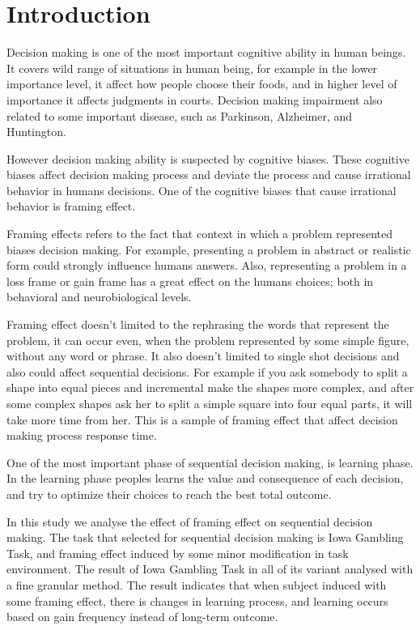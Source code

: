 \section{Introduction}

Decision making is one of the most important
cognitive ability in human beings.  It covers wild
range of situations in human being, for example in
the lower importance level, it affect how people
choose their foods, and in higher level of
importance it affects judgments in courts.
Decision making impairment also related to some
important disease, such as Parkinson, Alzheimer,
and Huntington.

However decision making ability is suspected by
cognitive biases. These cognitive biases affect
decision making process and deviate the process
and cause irrational behavior in humans decisions.
One of the cognitive biases that cause irrational
behavior is framing effect.


Framing effects refers to the fact that context in
which a problem represented biases decision
making.  For example, presenting a problem in
abstract or realistic form could strongly
influence humans answers. Also, representing a
problem in a loss frame or gain frame has a great
effect on the humans choices; both in behavioral
and neurobiological levels.

Framing effect doesn't limited to the rephrasing
the words that represent the problem, it can occur
even, when the problem represented by some simple
figure, without any word or phrase. It also
doesn't limited to single shot decisions and
also could affect sequential decisions. For example if
you ask somebody to split a shape into equal
pieces and incremental make the shapes more
complex, and after some complex shapes ask her to
split a simple square into four equal parts, it
will take more time from her. This is a sample of
framing effect that affect decision making process
response time.

One of the most important phase of sequential
decision making, is learning phase. In the
learning phase peoples learns the value and
consequence of each decision, and try to optimize
their choices to reach the best total outcome.

In this study we analyse the effect of framing
effect on sequential decision making. The task
that selected for sequential decision making is
Iowa Gambling Task, and framing effect induced by
some minor modification in task environment. The
result of Iowa Gambling Task in all of its variant
analysed with a fine granular method. The result
indicates that when subject induced with some
framing effect, there is changes in learning
process, and learning occurs based on gain
frequency instead of long-term outcome.


